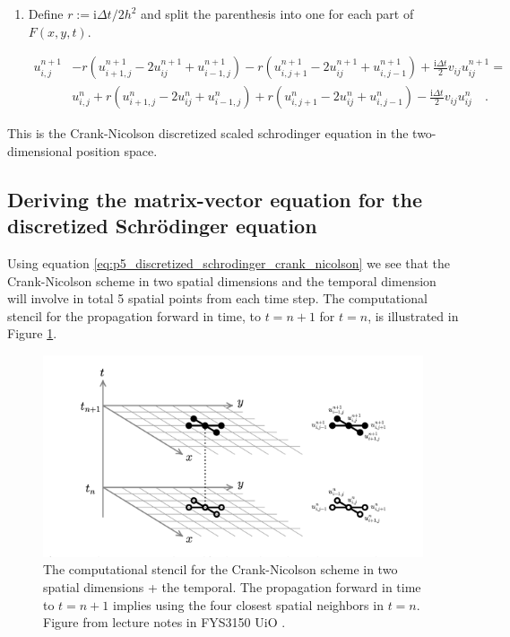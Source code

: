 \documentclass[../main_proj5.tex]{subfiles}
\begin{document}
\begin{enumerate}
    \item Define $r:=\text{i}\Delta t/2h^{2}$ and split the parenthesis into one for each part of $F(x,y,t)$.

\begin{equation}
\begin{split} 
u_{i,j}^{n+1} &- r\left( u_{i+1, j}^{n+1} -2u_{ij}^{n+1} + u_{i-1, j}^{n+1}\right) -r \left(u_{i, j+1}^{n+1} -2u_{ij}^{n+1} + u_{i, j-1}^{n+1}\right) + \frac{\text{i}\Delta t}{2} v_{ij} u_{ij}^{n+1}= \\& 
 u_{i,j}^{n} + r\left(u_{i+1, j}^{n} -2u_{ij}^{n} + u_{i-1, j}^{n}\right) + r \left(u_{i, j+1}^{n} -2u_{ij}^{n} + u_{i, j-1}^{n}\right) - \frac{\text{i}\Delta t}{2} v_{ij} u_{ij}^{n} 
\quad. 
\end{split}
\end{equation}
\end{enumerate}   

This is the Crank-Nicolson discretized scaled schrodinger equation in the two-dimensional position space. 

\newpage

\subsection{Deriving the matrix-vector equation for the discretized Schr\"odinger equation}\label{app:p5_AppendixA_matrix_vector}


Using equation \eqref{eq:p5_discretized_schrodinger_crank_nicolson} we see that the Crank-Nicolson scheme in two spatial dimensions and the temporal dimension will involve in total 5 spatial points from each time step. The computational stencil for the propagation forward in time, to $t=n+1$ for $t=n$, is illustrated in Figure \ref{fig:p5_comp_stencil_CNCS}. 

\begin{figure}[h!]
    \centering
    \includegraphics[width=0.6\linewidth]{Project 5/figures/comp_stencil_CNCS.png}
    \caption{The computational stencil for the Crank-Nicolson scheme in two spatial dimensions + the temporal. The propagation forward in time to $t=n+1$ implies using the four closest spatial neighbors in $t=n$. Figure from lecture notes in FYS3150 UiO \cite{lecture_notes}.}
    \label{fig:p5_comp_stencil_CNCS}
\end{figure}
\end{document}
